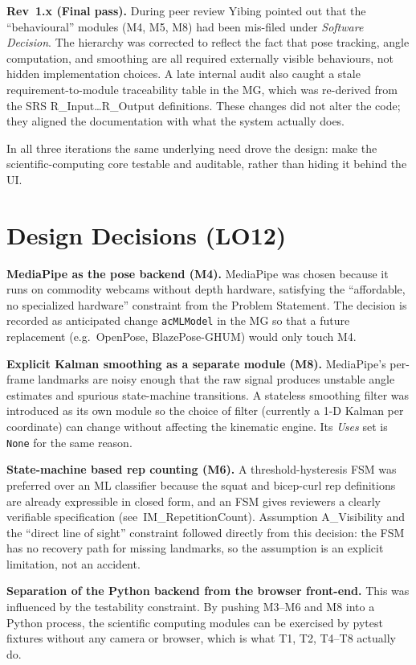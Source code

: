 \documentclass{article}
\begin{document}
\textbf{Rev~1.x (Final pass).} During peer review Yibing pointed out that
the ``behavioural'' modules (M4, M5, M8) had been mis-filed under
\emph{Software Decision}. The hierarchy was corrected to reflect the fact
that pose tracking, angle computation, and smoothing are all required
externally visible behaviours, not hidden implementation choices. A late
internal audit also caught a stale requirement-to-module traceability table
in the MG, which was re-derived from the SRS R\_Input\ldots R\_Output
definitions. These changes did not alter the code; they aligned the
documentation with what the system actually does.

In all three iterations the same underlying need drove the design: make
the scientific-computing core testable and auditable, rather than hiding it
behind the UI.

\section{Design Decisions (LO12)}

\textbf{MediaPipe as the pose backend (M4).} MediaPipe was chosen because it
runs on commodity webcams without depth hardware, satisfying the
``affordable, no specialized hardware'' constraint from the Problem
Statement. The decision is recorded as anticipated change \texttt{acMLModel}
in the MG so that a future replacement (e.g.\ OpenPose, BlazePose-GHUM)
would only touch M4.

\textbf{Explicit Kalman smoothing as a separate module (M8).} MediaPipe's
per-frame landmarks are noisy enough that the raw signal produces unstable
angle estimates and spurious state-machine transitions. A stateless
smoothing filter was introduced as its own module so the choice of filter
(currently a 1-D Kalman per coordinate) can change without affecting the
kinematic engine. Its \emph{Uses} set is \texttt{None} for the same reason.

\textbf{State-machine based rep counting (M6).} A threshold-hysteresis FSM
was preferred over an ML classifier because the squat and bicep-curl rep
definitions are already expressible in closed form, and an FSM gives
reviewers a clearly verifiable specification (see~IM\_RepetitionCount).
Assumption A\_Visibility and the ``direct line of sight'' constraint
followed directly from this decision: the FSM has no recovery path for
missing landmarks, so the assumption is an explicit limitation, not an
accident.

\textbf{Separation of the Python backend from the browser front-end.} This
was influenced by the testability constraint. By pushing M3--M6 and M8 into
a Python process, the scientific computing modules can be exercised by
pytest fixtures without any camera or browser, which is what T1, T2, T4--T8
actually do.
\end{document}
